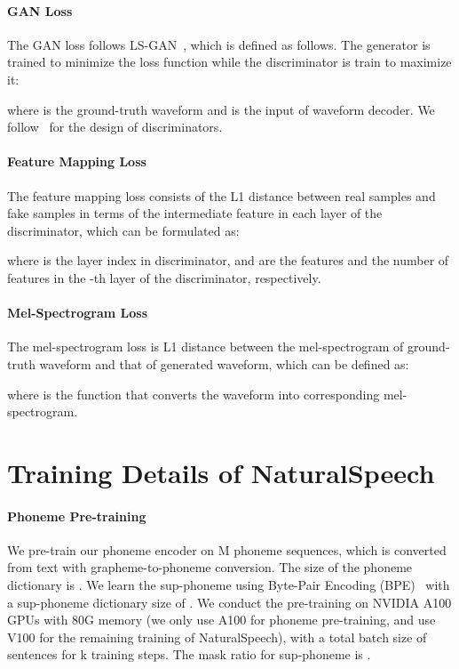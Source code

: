 \documentclass{article}
\theoremstyle{definition}
\def\myname{NaturalSpeech}
\begin{document}
\paragraph{GAN Loss}
The GAN loss follows LS-GAN~\citep{mao2017least}, which is defined as follows. The generator is trained to minimize the loss function while the discriminator is train to maximize it:

where is  the ground-truth waveform and  is the input of waveform decoder. We follow~\citep{kim2021conditional} for the design of discriminators.

\paragraph{Feature Mapping Loss}
The feature mapping loss consists of the L1 distance between real samples and fake samples in terms of the intermediate feature in each layer of the discriminator, which can be formulated as:

where  is the layer index in discriminator,  and  are the features and the number of features in the -th layer of the discriminator, respectively.

\paragraph{Mel-Spectrogram Loss}
The mel-spectrogram loss is L1 distance between the mel-spectrogram of ground-truth waveform and that of generated waveform, which can be defined as:

where  is the function that converts the waveform into corresponding mel-spectrogram.





\section{Training Details of \myname{}}
\label{appendix_training_details}




\paragraph{Phoneme Pre-training}
We pre-train our phoneme encoder on M phoneme sequences, which is converted from text with grapheme-to-phoneme conversion. The size of the phoneme dictionary is . We learn the sup-phoneme using Byte-Pair Encoding (BPE)~\citep{sennrich2015neural} with a sup-phoneme dictionary size of . We conduct the pre-training on  NVIDIA A100 GPUs with 80G memory (we only use A100 for phoneme pre-training, and use V100 for the remaining training of \myname{}), with a total batch size of  sentences for k training steps. The mask ratio for sup-phoneme is .  
\end{document}
